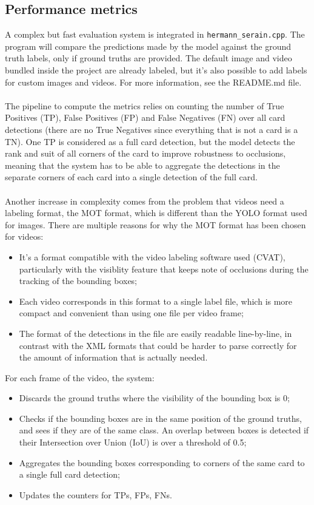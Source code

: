 \subsection{Performance metrics}
A complex but fast evaluation system is integrated in \texttt{hermann\_serain.cpp}. The program will compare the predictions made by the model against the ground truth labels, only if ground truths are provided. The default image and video bundled inside the project are already labeled,
but it's also possible to add labels for custom images and videos. For more information, see the README.md file.
\\\\
The pipeline to compute the metrics relies on counting the number of True Positives (TP), False Positives (FP) and False Negatives (FN) over all card detections (there are no True Negatives since everything that is not a card is a TN).
One TP is considered as a full card detection, but the model detects the rank and suit of all corners of the card to improve robustness to occlusions, meaning that the system has to be able to aggregate the detections in the separate corners of each card into a single detection of the full card.
\\\\
Another increase in complexity comes from the problem that videos need a labeling format, the MOT format, which is different than the YOLO format used for images.
There are multiple reasons for why the MOT format has been chosen for videos:
\begin{itemize}
    \item It's a format compatible with the video labeling software used (CVAT), particularly with the visiblity feature that keeps note of occlusions during the tracking of the bounding boxes;
    \item Each video corresponds in this format to a single label file, which is more compact and convenient than using one file per video frame;
    \item The format of the detections in the file are easily readable line-by-line, in contrast with the XML formats that could be harder to parse correctly for the amount of information that is actually needed.
\end{itemize}
For each frame of the video, the system:
\begin{itemize}
    \item Discards the ground truths where the visibility of the bounding box is 0;
    \item Checks if the bounding boxes are in the same position of the ground truths, and sees if they are of the same class. An overlap between boxes is detected if their Intersection over Union (IoU) is over a threshold of 0.5;
    \item Aggregates the bounding boxes corresponding to corners of the same card to a single full card detection;
    \item Updates the counters for TPs, FPs, FNs.
\end{itemize}
